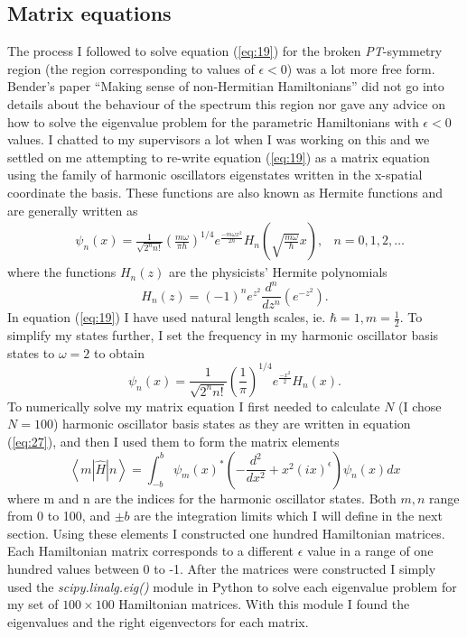 \documentclass[10pt, a4paper, singlespacing, headsepline]{report}
\newcommand\PT{\emph{PT}}
\begin{document}
\subsection{Matrix equations}\label{Matrix}
The process I followed to solve equation (\ref{eq:19}) for the broken \PT-symmetry region (the region corresponding to values of $\epsilon < 0$) was a lot more free form. Bender's paper ``Making sense of non-Hermitian Hamiltonians'' did not go into details about the behaviour of the spectrum this region nor gave any advice on how to solve the eigenvalue problem for the parametric Hamiltonians with $\epsilon < 0$ values. I chatted to my supervisors a lot when I was working on this and we settled on me attempting to re-write equation (\ref{eq:19}) as a matrix equation using the family of harmonic oscillators eigenstates written in the x-spatial coordinate the basis. These functions are also known as Hermite functions and are generally written as
\begin{align} \label{eq:25}
&\psi_n(x)= \frac{1}{\sqrt{2^n n!}} 
\left ( \frac{m \omega}{\pi \hbar}\right )^{1/4} e^{\frac{-m \omega x^2}{2 \hbar}}
H_n \left (\sqrt{\frac{m \omega}{\hbar}}x\right ),  &n = 0, 1, 2, \dots
\end{align}
where the functions $H_n(z)$ are the physicists' Hermite polynomials
\begin{equation} \label{eq:26}
H_n(z) = (-1)^n e^{z^2} \frac{d^n}{dz^n}\left( e^{-z^2}\right).
\end{equation}
In equation (\ref{eq:19}) I have used natural length scales, ie. $\hbar = 1, m = \frac{1}{2}$. To simplify my states further, I set the frequency in my harmonic oscillator basis states to $\omega = 2$ to obtain
\begin{equation} \label{eq:27}
\psi_n(x)= \frac{1}{\sqrt{2^n n!}} 
\left ( \frac{1}{\pi}\right )^{1/4} e^{\frac{-x^2}{2}}
H_n (x).
\end{equation}
To numerically solve my matrix equation I first needed to calculate $N$ (I chose $N = 100$) harmonic oscillator basis states as they are written in equation (\ref{eq:27}), and then I used them to form the matrix elements 
\begin{equation}\label{eq:28}
\left \langle m \left |\hat{H} \right|n \right \rangle = \int_{-b}^{b} \psi_m(x)^* \left (  - \frac{d^2}{dx^2} + x^2(ix)^{\epsilon}\right ) \psi_n(x) dx
\end{equation}
where m and n are the indices for the harmonic oscillator states. Both $m, n$ range from 0 to 100, and $\pm b$ are the integration limits which I will define in the next section. Using these elements I constructed one hundred Hamiltonian matrices. Each Hamiltonian matrix corresponds to a different $\epsilon$ value in a range of one hundred values between 0 to -1. 
After the matrices were constructed I simply used the \emph{scipy.linalg.eig()} module in Python to solve each eigenvalue problem for my set of $100\times100$ Hamiltonian matrices. With this module I found the eigenvalues and the right eigenvectors for each matrix.
\end{document}
